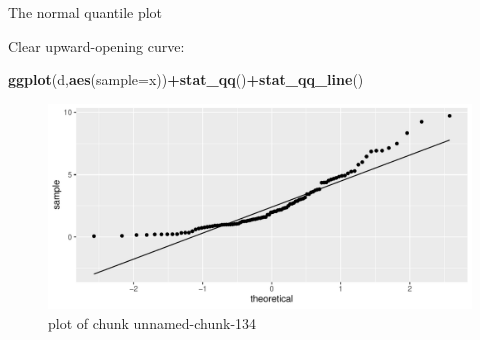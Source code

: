 \documentclass[
  ignorenonframetext,
]{beamer}
\newenvironment{Shaded}{\begin{snugshade}}{\end{snugshade}}
\newcommand{\DataTypeTok}[1]{\textcolor[rgb]{0.13,0.29,0.53}{#1}}
\newcommand{\KeywordTok}[1]{\textcolor[rgb]{0.13,0.29,0.53}{\textbf{#1}}}
\newcommand{\NormalTok}[1]{#1}
\newcommand{\OperatorTok}[1]{\textcolor[rgb]{0.81,0.36,0.00}{\textbf{#1}}}
\begin{document}
\begin{frame}[fragile]{The normal quantile plot}
\protect\hypertarget{the-normal-quantile-plot-4}{}

Clear upward-opening curve:

\begin{Shaded}
\begin{Highlighting}[]
\KeywordTok{ggplot}\NormalTok{(d,}\KeywordTok{aes}\NormalTok{(}\DataTypeTok{sample=}\NormalTok{x))}\OperatorTok{+}\KeywordTok{stat_qq}\NormalTok{()}\OperatorTok{+}\KeywordTok{stat_qq_line}\NormalTok{()}
\end{Highlighting}
\end{Shaded}

\begin{figure}
\centering
\includegraphics{figure/unnamed-chunk-134-1.pdf}
\caption{plot of chunk unnamed-chunk-134}
\end{figure}

\end{frame}
\end{document}
